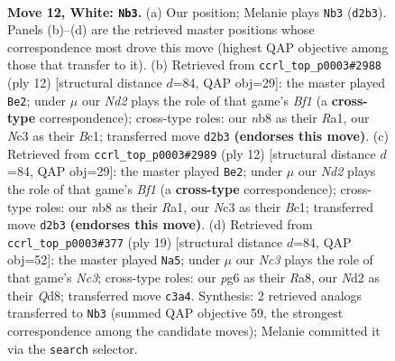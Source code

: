 \documentclass[11pt]{article}
\begin{document}
\clearpage

\begin{figure}[p]\centering
\begin{subfigure}{0.46\textwidth}\centering
\resizebox{\linewidth}{!}{%
\newchessgame
\chessboard[
  setfen={rnb1k1r1/1p1qbp1p/p3p1p1/2Pp3n/3P4/2N5/PP1N1PPP/1RBQKB1R w q - 0 12},
  showmover=false,
  pgfstyle=straightmove, color=movearrow, markmove={d2-b3}
]}
\caption{}
\end{subfigure}\hfill
\begin{subfigure}{0.46\textwidth}\centering
\resizebox{\linewidth}{!}{%
\newchessgame
\chessboard[
  setfen={rnbqkb1r/p4ppp/1p1ppn2/8/2PNP3/2N5/PP3PPP/R1BQKB1R w KQkq - 0 7},
  showmover=false,
  pgfstyle=straightmove, color=movearrow, markmove={f1-e2}
]}
\caption{}
\end{subfigure}
\\[4pt]
\begin{subfigure}{0.46\textwidth}\centering
\resizebox{\linewidth}{!}{%
\newchessgame
\chessboard[
  setfen={rnbqkb1r/p4ppp/1p1ppn2/8/2PNP3/2N5/PP3PPP/R1BQKB1R w KQkq - 0 7},
  showmover=false,
  pgfstyle=straightmove, color=movearrow, markmove={f1-e2}
]}
\caption{}
\end{subfigure}\hfill
\begin{subfigure}{0.46\textwidth}\centering
\resizebox{\linewidth}{!}{%
\newchessgame
\chessboard[
  setfen={r2qkb1r/1pp1nppp/p1n5/3pPb2/3P4/P1N1BN1P/1P3PP1/R2QKB1R b KQkq - 2 10},
  showmover=false,
  pgfstyle=straightmove, color=movearrow, markmove={c6-a5}
]}
\caption{}
\end{subfigure}
\caption{\textbf{Move 12, White: \texttt{Nb3}.} (a) Our position; Melanie plays \texttt{Nb3} (\texttt{d2b3}). Panels (b)--(d) are the retrieved master positions whose correspondence most drove this move (highest QAP objective among those that transfer to it). (b) Retrieved from \texttt{ccrl\_top\_p0003\#2988} (ply 12) [structural distance $d$=84, QAP obj=29]: the master played \texttt{Be2}; under $\mu$ our \emph{Nd2} plays the role of that game's \emph{Bf1} (a \textbf{cross-type} correspondence); cross-type roles: our \emph{n}b8 as their \emph{R}a1, our \emph{N}c3 as their \emph{B}c1; transferred move \texttt{d2b3} \textbf{(endorses this move)}. (c) Retrieved from \texttt{ccrl\_top\_p0003\#2989} (ply 12) [structural distance $d$=84, QAP obj=29]: the master played \texttt{Be2}; under $\mu$ our \emph{Nd2} plays the role of that game's \emph{Bf1} (a \textbf{cross-type} correspondence); cross-type roles: our \emph{n}b8 as their \emph{R}a1, our \emph{N}c3 as their \emph{B}c1; transferred move \texttt{d2b3} \textbf{(endorses this move)}. (d) Retrieved from \texttt{ccrl\_top\_p0003\#377} (ply 19) [structural distance $d$=84, QAP obj=52]: the master played \texttt{Na5}; under $\mu$ our \emph{Nc3} plays the role of that game's \emph{Nc3}; cross-type roles: our \emph{p}g6 as their \emph{R}a8, our \emph{N}d2 as their \emph{Q}d8; transferred move \texttt{c3a4}. Synthesis: 2 retrieved analogs transferred to \texttt{Nb3} (summed QAP objective 59, the strongest correspondence among the candidate moves); Melanie committed it via the \texttt{search} selector.}
\label{fig:thought-m22}
\end{figure}
\end{document}
